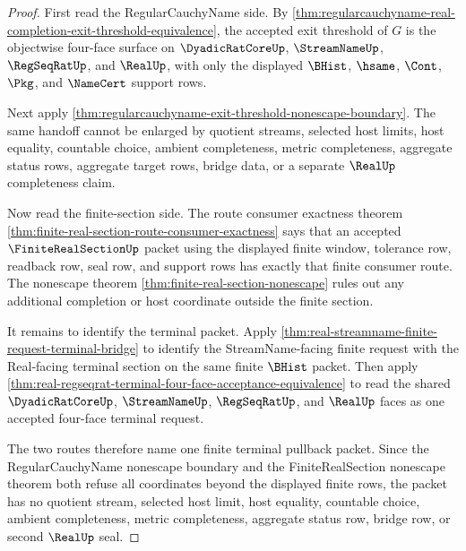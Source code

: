 \begin{proof}
First read the RegularCauchyName side. By \autoref{thm:regularcauchyname-real-completion-exit-threshold-equivalence}, the accepted exit threshold of $G$ is the objectwise four-face surface on $\DyadicRatCoreUp$, $\StreamNameUp$, $\RegSeqRatUp$, and $\RealUp$, with only the displayed $\BHist$, $\hsame$, $\Cont$, $\Pkg$, and $\NameCert$ support rows.

Next apply \autoref{thm:regularcauchyname-exit-threshold-nonescape-boundary}. The same handoff cannot be enlarged by quotient streams, selected host limits, host equality, countable choice, ambient completeness, metric completeness, aggregate status rows, aggregate target rows, bridge data, or a separate $\RealUp$ completeness claim.

Now read the finite-section side. The route consumer exactness theorem \autoref{thm:finite-real-section-route-consumer-exactness} says that an accepted $\FiniteRealSectionUp$ packet using the displayed finite window, tolerance row, readback row, seal row, and support rows has exactly that finite consumer route. The nonescape theorem \autoref{thm:finite-real-section-nonescape} rules out any additional completion or host coordinate outside the finite section.

It remains to identify the terminal packet. Apply \autoref{thm:real-streamname-finite-request-terminal-bridge} to identify the StreamName-facing finite request with the Real-facing terminal section on the same finite $\BHist$ packet. Then apply \autoref{thm:real-regseqrat-terminal-four-face-acceptance-equivalence} to read the shared $\DyadicRatCoreUp$, $\StreamNameUp$, $\RegSeqRatUp$, and $\RealUp$ faces as one accepted four-face terminal request.

The two routes therefore name one finite terminal pullback packet. Since the RegularCauchyName nonescape boundary and the FiniteRealSection nonescape theorem both refuse all coordinates beyond the displayed finite rows, the packet has no quotient stream, selected host limit, host equality, countable choice, ambient completeness, metric completeness, aggregate status row, bridge row, or second $\RealUp$ seal.
\end{proof}

